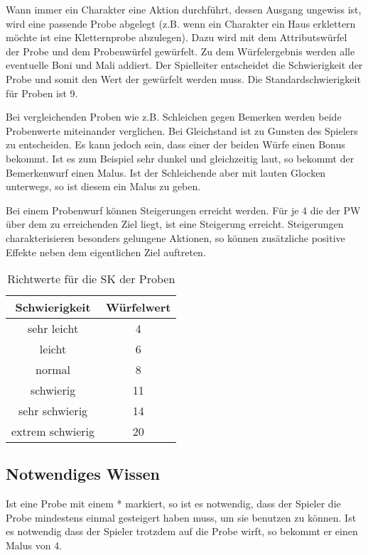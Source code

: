 \documentclass[../../Heldenanleitung2]{subfiles}
\begin{document}
Wann immer ein Charakter eine Aktion durchführt, dessen Ausgang ungewiss ist, wird eine passende Probe abgelegt (z.B. wenn ein Charakter ein Haus erklettern möchte ist eine Kletternprobe abzulegen). Dazu wird mit dem Attributswürfel der Probe und dem Probenwürfel gewürfelt. Zu dem Würfelergebnis werden alle eventuelle Boni und Mali addiert. Der Spielleiter entscheidet die Schwierigkeit der Probe und somit den Wert der gewürfelt werden muss. Die Standardschwierigkeit für Proben ist 9.

Bei vergleichenden Proben wie z.B. Schleichen gegen Bemerken werden beide Probenwerte miteinander verglichen. Bei Gleichstand ist zu Gunsten des Spielers zu entscheiden. Es kann jedoch sein, dass einer der beiden Würfe einen Bonus bekommt. Ist es zum Beispiel sehr dunkel und gleichzeitig laut, so bekommt der Bemerkenwurf einen Malus. Ist der Schleichende aber mit lauten Glocken unterwegs, so ist diesem ein Malus zu geben.

Bei einem Probenwurf können Steigerungen erreicht werden. Für je 4 die der PW über dem zu erreichenden Ziel liegt, ist eine Steigerung erreicht. Steigerungen charakterisieren besonders gelungene Aktionen, so können zusätzliche positive Effekte neben dem eigentlichen Ziel auftreten.

{
\begin{table}[h!]
\caption{Richtwerte für die SK der Proben}
\centering
\begin{tabular}{|c|c|}
\hline
Schwierigkeit & Würfelwert \\
\hline
sehr leicht & 4\\
leicht & 6\\
normal & 8\\
schwierig & 11\\
sehr schwierig & 14\\
extrem schwierig & 20\\ \hline
\end{tabular}
\end{table}
}

\subsection{Notwendiges Wissen}
Ist eine Probe mit einem * markiert, so ist es notwendig, dass der Spieler die Probe mindestens einmal gesteigert haben muss, um sie benutzen zu können. Ist es notwendig dass der Spieler trotzdem auf die Probe wirft, so bekommt er einen Malus von 4.
\end{document}
